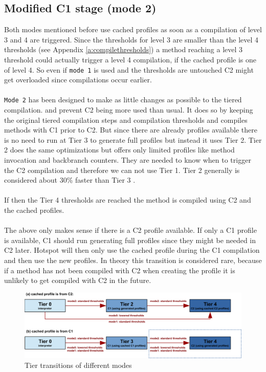 \subsection{Modified C1 stage (mode 2)}
\label{s:mode2}
Both modes mentioned before use cached profiles as soon as a compilation of level 3 and 4 are triggered. Since the thresholds for level 3 are smaller than the level 4 thresholds (see Appendix \ref{a:compilethresholds}) a method reaching a level 3 threshold could actually trigger a level 4 compilation, if the cached profile is one of level 4. So even if \texttt{mode 1} is used and the thresholds are untouched C2 might get overloaded since compilations occur earlier.
\\\\
\texttt{Mode 2} has been designed to make as little changes as possible to the tiered compilation. and prevent C2 being more used than usual. It does so by keeping the original tiered compilation steps and compilation thresholds and compiles methods with C1 prior to C2. But since there are already profiles available there is no need to run at Tier 3 to generate full profiles but instead it uses Tier 2.
Tier 2 does the same optimizations but offers only limited profiles like method invocation and backbranch counters. They are needed to know when to trigger the C2 compilation and therefore we can not use Tier 1. Tier 2 generally is considered about 30\% faster than Tier 3 \cite{code_atp_hpp}.
\\\\
If then the Tier 4 thresholds are reached the method is compiled using C2 and the cached profiles.
\\\\
The above only makes sense if there is a C2 profile available.
If only a C1 profile is available, C1 should run generating full profiles since they might be needed in C2 later. Hotspot will then only use the cached profile during the C1 compilation and then use the new profiles.
In theory this transition is considered rare, because if a method has not been compiled with C2 when creating the profile it is unlikely to get compiled with C2 in the future.

\begin{figure}[h]
  \begin{center}
    \centering
    \includegraphics{figures/hs_tiers_threshold.png}
    \caption{Tier transitions of different modes}
    \label{f:hs_tiers_thresholds}
  \end{center}
\end{figure}


